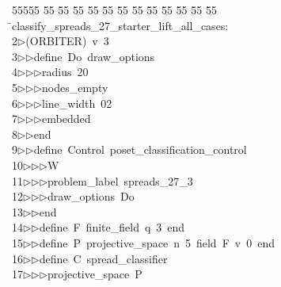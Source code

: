 %
%
\begin{tabbing}
55555 \= 55 \= 55 \= 55 \= 55 \= 55 \= 55 \= 55 \= 55 \= 55 \= 55 \= 55 \= 55 \= \>classify\_spreads\_27\_starter\_lift\_all\_cases:\\[0pt]
2\>$\triangleright$\>(ORBITER)\ v\ 3\ \\[0pt]
3\>$\triangleright$\>$\triangleright$\>define\ Do\ draw\_options\ \\[0pt]
4\>$\triangleright$\>$\triangleright$\>$\triangleright$\>radius\ 20\ \\[0pt]
5\>$\triangleright$\>$\triangleright$\>$\triangleright$\>nodes\_empty\ \\[0pt]
6\>$\triangleright$\>$\triangleright$\>$\triangleright$\>line\_width\ 02\ \\[0pt]
7\>$\triangleright$\>$\triangleright$\>$\triangleright$\>embedded\ \\[0pt]
8\>$\triangleright$\>$\triangleright$\>end\ \\[0pt]
9\>$\triangleright$\>$\triangleright$\>define\ Control\ poset\_classification\_control\ \\[0pt]
10\>$\triangleright$\>$\triangleright$\>$\triangleright$\>W\ \\[0pt]
11\>$\triangleright$\>$\triangleright$\>$\triangleright$\>problem\_label\ spreads\_27\_3\ \\[0pt]
12\>$\triangleright$\>$\triangleright$\>$\triangleright$\>draw\_options\ Do\ \\[0pt]
13\>$\triangleright$\>$\triangleright$\>end\ \\[0pt]
14\>$\triangleright$\>$\triangleright$\>define\ F\ finite\_field\ q\ 3\ end\ \\[0pt]
15\>$\triangleright$\>$\triangleright$\>define\ P\ projective\_space\ n\ 5\ field\ F\ v\ 0\ end\ \\[0pt]
16\>$\triangleright$\>$\triangleright$\>define\ C\ spread\_classifier\ \\[0pt]
17\>$\triangleright$\>$\triangleright$\>$\triangleright$\>projective\_space\ P\ \\[0pt]

\end{tabbing}
